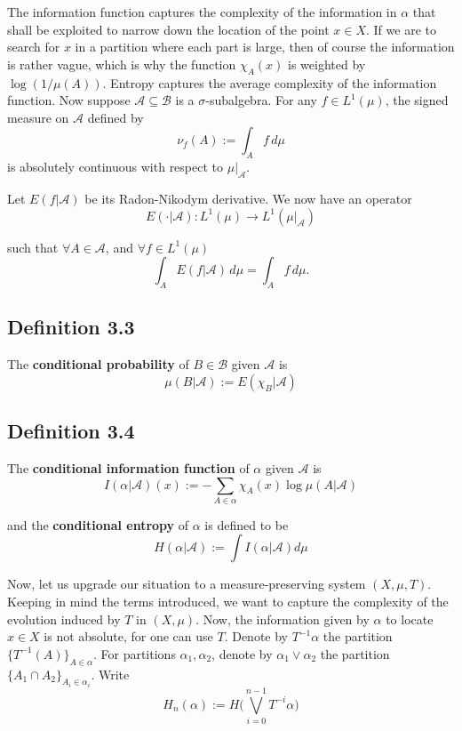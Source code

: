 \documentclass[11pt,a4paper]{article}
\begin{document}

The information function captures the complexity of the information in
$\alpha$ that shall be exploited to narrow down the location of the point
$x\in X$. If we are to search for $x$ in a partition where each part is large,
then of course the information is rather vague, which is why the function
$\chi_A(x)$ is weighted by $\log(1/\mu(A))$. Entropy captures the average
complexity of the information function. Now suppose
$\mathcal A\subseteq\mathcal B$ is a $\sigma$-subalgebra. For any
$f\in L^1(\mu)$, the signed measure on $\mathcal A$ defined by
\[
\nu_f(A):=\int_A f\,d\mu
\]
is absolutely continuous with respect to $\mu|_{\mathcal A}$.

Let $E(f|\mathcal{A})$ be its Radon-Nikodym derivative. We now have an operator
\[
E(\cdot|\mathcal{A}):L^1(\mu) \rightarrow L^1(\mu|_{\mathcal{A}})
\]

such that $\forall A\in \mathcal{A}$, and $\forall f\in L^1(\mu)$
\[
\int_AE(f|\mathcal{A})\,d\mu = \int_Af\,d\mu.
\]

\subsection*{Definition 3.3}
    The \textbf{conditional probability} of $B\in \mathcal{B}$ given $\mathcal{A}$ is
    $$\mu(B|\mathcal{A}) := E(\chi_B|\mathcal{A})$$

\subsection*{Definition 3.4}
    The \textbf{conditional information function} of $\alpha$ given $\mathcal{A}$ is
    $$I(\alpha|\mathcal{A})(x):= -\sum_{A\in \alpha}\chi_A(x)\log{\mu(A|\mathcal{A})}$$

    and the \textbf{conditional entropy} of $\alpha$ is defined to be
    \[
    H(\alpha|\mathcal{A}):= \int I(\alpha|\mathcal{A})d\mu
    \]


Now, let us upgrade our situation to a measure-preserving system $(X, \mu, T)$. Keeping in mind the terms introduced, we want to capture the complexity of the evolution induced by $T$ in $(X, \mu)$. Now, the information given by $\alpha$ to locate $x\in X$ is not absolute, for one can use $T$. Denote by $T^{-1}\alpha$ the partition $\{T^{-1}(A)\}_{A\in \alpha}$. For partitions $\alpha_1, \alpha_2$, denote by $\alpha_1\vee\alpha_2$ the partition $\{A_1\cap A_2\}_{A_i\in \alpha_i}$. Write
$$H_n(\alpha) := H\Bigg(\bigvee_{i=0}^{n-1}T^{-i}\alpha\Bigg)$$
\end{document}
